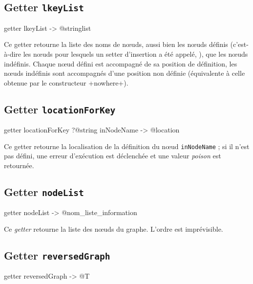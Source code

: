 \subsection{Getter \texttt{lkeyList}}

\begin{galgas}
getter lkeyList -> @stringlist 
\end{galgas}

Ce getter retourne la liste des noms de nœuds, aussi bien les nœuds définis (c'est-à-dire les nœuds pour lesquels un setter d'insertion a été appelé, ), que les nœuds indéfinis. Chaque nœud défini est accompagné de sa position de définition, les nœuds indéfinis sont accompagnés d'une position non définie (équivalente à celle obtenue par le constructeur \ggs+nowhere+).






\subsection{Getter \texttt{locationForKey}}

\begin{galgas}
getter locationForKey ?@string inNodeName -> @location
\end{galgas}

Ce getter retourne la localisation de la définition du nœud \texttt{inNodeName} ; si il n'est pas défini, une erreur d'exécution est déclenchée et une valeur \emph{poison} est retournée.


\subsection{Getter \texttt{nodeList}}

\begin{galgas}
getter nodeList -> @nom_liste_information
\end{galgas}

Ce \emph{getter} retourne la liste des nœuds du graphe. L'ordre est imprévisible.




\subsection{Getter \texttt{reversedGraph}}

\begin{galgas}
getter reversedGraph -> @T 
\end{galgas}

